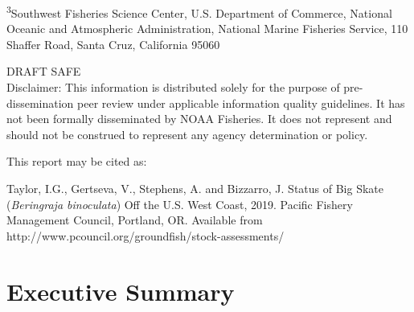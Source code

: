 \documentclass[12pt,]{article}
\begin{document}
\begin{center}
\vspace{.3cm}

\textsuperscript{3}Southwest Fisheries Science Center, U.S. Department of Commerce, National Oceanic and Atmospheric Administration, National Marine Fisheries Service, 110 Shaffer Road, Santa Cruz, California 95060\\


\vspace{.5cm}

\vfill
DRAFT SAFE\\
Disclaimer: This information is distributed solely for the purpose of pre-dissemination
peer review under applicable information quality guidelines. It has not been formally
disseminated by NOAA Fisheries. It does not represent and should not be construed to
represent any agency determination or policy. 

\vspace{.3cm}


\newpage{\thispagestyle{empty}}

\vspace*{\fill}
\begin{flushleft}
This report may be cited as:

Taylor, I.G., Gertseva, V., Stephens, A. and Bizzarro, J. Status of Big Skate (\emph{Beringraja binoculata}) Off the U.S. West Coast, 2019. Pacific Fishery Management Council, Portland, OR. Available from http://www.pcouncil.org/groundfish/stock-assessments/
\end{flushleft}

\maketitle

\setcounter{page}{1}
\end{center}

{
\setcounter{tocdepth}{4}
\tableofcontents
}
\setlength{\parskip}{5mm plus1mm minus1mm}
\pagebreak


\renewcommand{\thefigure}{\alph{figure}}
\renewcommand{\thetable}{\alph{table}}

\hypertarget{executive-summary}{%
\section*{Executive Summary}\label{executive-summary}}
\end{document}
